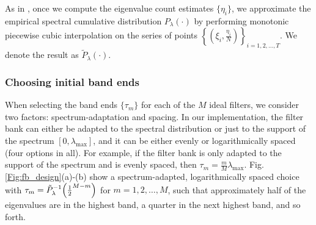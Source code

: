 \documentclass[journal, 10pt]{IEEEtran}
\begin{document}
As in \cite{shuman2013spectrum}, once we compute the eigenvalue count estimates $\{\eta_i\}$, we approximate the empirical spectral cumulative distribution $P_{\lambda}(\cdot)$ by performing monotonic piecewise cubic interpolation \cite{fritsch} on the series of points $\left\{\left(\xi_i,\frac{\eta_i}{N}\right)\right\}_{i=1,2,\ldots,T}$. We denote the result as $\tilde{P}_{\lambda}(\cdot)$.




\subsubsection{Choosing initial band ends}

When selecting the band ends $\{\tau_m\}$ for each of the $M$ ideal filters, we consider two factors: spectrum-adaptation and spacing. In our implementation, the filter bank can either be adapted to the spectral distribution or just to the support of the spectrum $[0,\lambda_{\max}]$, and it can be either evenly or logarithmically spaced (four options in all). For example, if the filter bank is only adapted to the support of the spectrum and is evenly spaced, then $\tau_m=\frac{m}{M}\lambda_{\max}$. Fig. \ref{Fig:fb_design}(a)-(b) show a spectrum-adapted, logarithmically spaced choice with $\tau_m=\tilde{P}^{-1}_{\lambda}\Bigl(\frac{1}{2}^{M-m}\Bigr)$ for $m=1,2,\ldots,M$, such that approximately half of the eigenvalues are in the highest band, a quarter in the next highest band, and so forth. 
\end{document}
